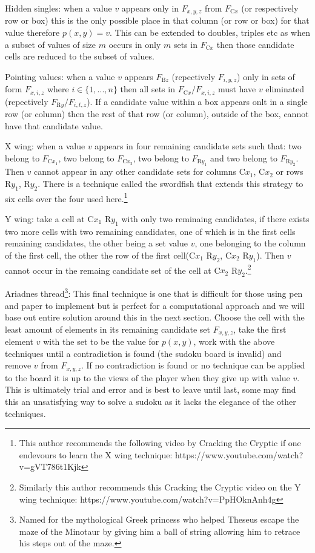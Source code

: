 \documentclass[a4paper,11pt]{report}
\newcounter{row}
\newcounter{col}
\begin{document}
Hidden singles: when a value $v$ appears only in $F_{x,y,z}$ from $F_{\text{C}x}$ (or respectively row or box) this is the only possible place in that column (or row or box) for that value therefore $p(x,y)=v$. This can be extended to doubles, triples etc as when a subset of values of size $m$ occurs in only $m$ sets in $F_{\text{C}x}$ then those candidate cells are reduced to the subset of values.

Pointing values: when a value $v$ appears $F_{\text{B}z}$ (repectively $F_{i,y,z}$) only in sets of form $F_{x,i,z}$  where $i\in \{1,...,n\}$ then all sets in $F_{\text{C}x}/F_{x,i,z}$ must have $v$ eliminated (repectively $F_{\text{R}y}/F_{i,t,z}$). If a candidate value within a box appears onlt in a single row (or column) then the rest of that row (or column), outside of the box, cannot have that candidate value.

X wing: when a value $v$ appears in four remaining candidate sets such that: two belong to $F_{\text{C}x_1}$, two belong to $F_{\text{C}x_2}$, two belong to $F_{\text{R}y_1}$ and two belong to $F_{\text{R}y_2}$. Then $v$ cannot appear in any other candidate sets for columns C$x_1$, C$x_2$ or rows R$y_1$, R$y_2$. There is a technique called the swordfish that extends this strategy to six cells over the four used here.\footnote{This author recommends the following video by Cracking the Cryptic if one endevours to learn the X wing technique: https://www.youtube.com/watch?v=gVT786t1Kjk}

Y wing: take a cell at C$x_1$ R$y_1$ with only two reminaing candidates, if there exists two more cells with two remaining candidates, one of which is in the first cells remaining candidates, the other being a set value $v$, one belonging to the column of the first cell, the other the row of the first cell(C$x_1$ R$y_2$, C$x_2$ R$y_1$). Then $v$ cannot occur in the remaing candidate set of the cell at C$x_2$ R$y_2$.\footnote{Similarly this author recommends this Cracking the Cryptic video on the Y wing technique: https://www.youtube.com/watch?v=PpHOknAnh4g}

Ariadnes thread\footnote{Named for the mythological Greek princess who helped Theseus escape the maze of the Minotaur by giving him a ball of string allowing him to retrace his steps out of the maze.}: This final technique is one that is difficult for those using pen and paper to implement but is perfect for a computational approach and we will base out entire solution around this in the next section. Choose the cell with the least amount of elements in its remaining candidate set $F_{x,y,z}$, take the first element $v$ with the set to be the value for $p(x,y)$, work with the above techniques until a contradiction is found (the sudoku board is invalid) and remove $v$ from $F_{x,y,z}$. If no contradiction is found or no technique can be applied to the board it is up to the views of the player when they give up with value $v$. This is ultimately trial and error and is best to leave until last, some may find this an unsatisfying way to solve a sudoku as it lacks the elegance of the other techniques. 
\end{document}
